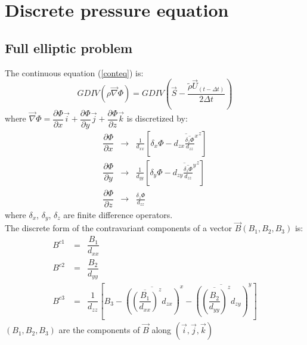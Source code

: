 \section{Discrete pressure equation}
\subsection{Full elliptic problem}
\par The continuous equation (\ref{conteq}) is:\\
\begin{equation}
\label{pressure}
GDIV(\rho  \overrightarrow{\nabla} \Phi) = GDIV \left( \overrightarrow {S} -
\dfrac{\tilde{\rho} \vec{U}_{(t-\Delta t)} }
{2 \Delta t}
\right)
\end{equation}
where
$
\overrightarrow{\nabla}\Phi =
\dfrac {\partial{\Phi  } } {\partial{x} }  \vec{i} +
\dfrac {\partial{\Phi } } {\partial{y} }  \vec{j} +
\dfrac {\partial{\Phi  } } {\partial{z} }  \vec{k}
$
is discretized by:
\begin{eqnarray}
\label{gradx}
\dfrac { \partial {\Phi}} {\partial{x}} &\rightarrow&  \frac {1}
{d_{xx} } \left[ \delta_x \Phi -
\overline { d_{zx} \overline { \frac { \delta_z \Phi} {d_{zz} } }^x }
^z \right] \\
\label{grady}
\dfrac {\partial {\Phi}} {\partial{y}} &\rightarrow&  \frac {1}
{d_{yy} } \left[ \delta_y \Phi -
\overline { d_{zy} \overline { \frac { \delta_z \Phi} {d_{zz} } }^y } ^z
\right] \\
\label{gradz}
\dfrac {\partial {\Phi}} {\partial{z}} &\rightarrow& \frac {\delta_z \Phi}
{ d_{zz}}
\end{eqnarray}
where $\delta _x$, $\delta _y$, $\delta _z $ are finite difference operators.\\
The discrete form of the contravariant components of a vector $\vec{B}
(B_1, B_2, B_3)$ is:
\begin{eqnarray}
 B^{c1} \;  &  = &
 \dfrac{{B_1}}{ d_{xx}} \\
 B^{c2} \;  &  = &
 \dfrac{{B_2}}{ d_{yy}} \\
 B^{c3} \;  & = &
\dfrac{1}{d_{zz}}
\left[  B_3 -
\overline{\left( \overline{\left(
 \dfrac{ {B_1}}{d_{xx}} \right)}^{z}
d_{zx}\right)}^{x}
-  \overline{\left( \overline{\left(\dfrac{
{B_2}}{d_{yy}}\right)}^{z}d_{zy}\right)}^{y}\right]
\end{eqnarray}
$(B_1, B_2, B_3)$ are the components of $\vec{B}$ along
$\left( \vec{i}, \vec{j}, \vec{k} \right)$
